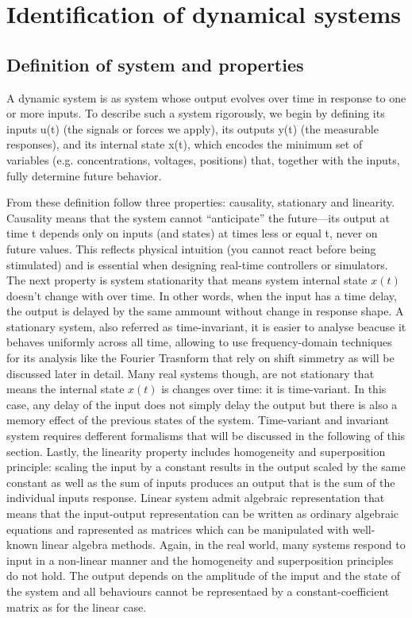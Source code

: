 \chapter{Identification of dynamical systems}
\minitoc

\section{Definition of system and properties}
A dynamic system is as system whose output evolves over time in response to one or more inputs.  To describe such a system rigorously, we begin by defining its inputs u(t) (the signals or forces we apply), its outputs y(t) (the measurable responses), and its internal state x(t), which encodes the minimum set of variables (e.g. concentrations, voltages, positions) that, together with the inputs, fully determine future behavior. 

From these definition follow three properties: causality, stationary and linearity. Causality means that the system cannot “anticipate” the future—its output at time t depends only on inputs (and states) at times less or equal t, never on future values.  This reflects physical intuition (you cannot react before being stimulated) and is essential when designing real-time controllers or simulators. The next property is system stationarity that means system internal state $x(t)$ doesn't change with over time. In other words, when the input has a time delay, the output is delayed by the same ammount without change in response shape. A stationary system, also referred as time-invariant, it is easier to analyse beacuse it behaves uniformly across all time, allowing to use frequency-domain techniques for its analysis like the Fourier Trasnform that rely on shift simmetry as will be discussed later in detail. Many real systems though, are not stationary that means the internal state $x(t)$ is changes over time: it is time-variant. In this case, any delay of the input does not simply delay the output but there is also a memory effect of the previous states of the system. Time-variant and invariant system requires defferent formalisms that will be discussed in the following of this section. Lastly, the linearity property includes homogeneity and superposition principle: scaling the input by a constant results in the output scaled by the same constant as well as the sum of inputs produces an output that is the sum of the individual inputs response. Linear system admit algebraic representation that means that the input-output representation can be written as ordinary algebraic equations and rapresented as matrices which can be manipulated with well-known linear algebra methods. Again, in the real world, many systems respond to input in a non-linear manner and the homogeneity and superposition principles do not hold. The output depends on the amplitude of the imput and the state of the system and all behaviours cannot be representaed by a constant-coefficient matrix as for the linear case.

